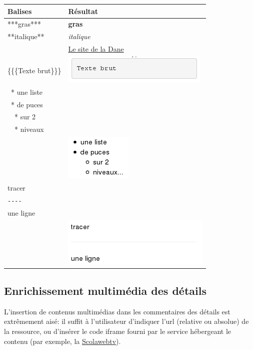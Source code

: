 \documentclass[a4paper,12pt]{report}
\begin{document}
\begin{center}
 \begin{tabular}{|l|l|}
 \hline
  Balises & Résultat\\
  \hline
  \hline
  ***gras*** & \textbf{gras}\\
  \hline
  **italique** & \textit{italique}\\
  \hline
  [http://dane.ac-versailles.fr Le site de la Dane] & \href{http://dane.ac-versailles/fr}{Le site de la Dane}\\
  \hline
  \{\{\{Texte brut\}\}\} & \includegraphics[scale=0.7]{./images/texte_brut}\\
  \hline
  ~* une liste\\
  ~* de puces\\
  ~~* sur 2\\
  ~~* niveaux\\ & \includegraphics[scale=0.7]{./images/liste_puce}\\
  \hline
  tracer\\
  \verb|----|\\
  une ligne\\ & \includegraphics[scale=0.7]{./images/ligne_commentaire}
  \end{tabular}
\end{center}

\subsection{Enrichissement multimédia des détails}\label{details_multimedia}

L'insertion de contenus multimédias dans les commentaires des détails est extrêmement aisé:
il suffit à l'utilisateur d'indiquer l'url (relative ou absolue) de la ressource, ou d'insérer le code iframe
fourni par le service hébergeant le contenu (par exemple, la \href{https://scolawebtv.crdp-versailles.fr/}{Scolawebtv}).
\end{document}
